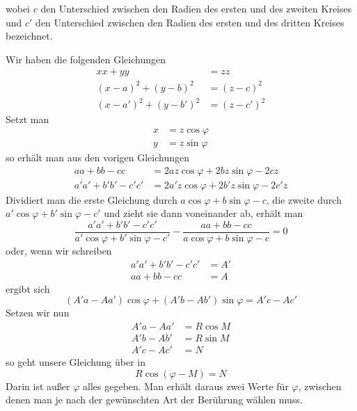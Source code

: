 %
wobei \(c\) den Unterschied zwischen den Radien des ersten und des zweiten Kreises und \(c'\) den Unterschied zwischen den Radien des ersten und des dritten Kreises bezeichnet.

Wir haben die folgenden Gleichungen
\[
\begin{aligned}
xx+yy&=zz\\
(x-a)^2+(y-b)^2&=(z-c)^2\\
(x-a')^2+(y-b')^2&=(z-c')^2
\end{aligned}
\]
Setzt man
\[
\begin{aligned}x&=z\cos\varphi\\y&=z\sin\varphi\end{aligned}
\]
so erhält man aus den vorigen Gleichungen
\[
\begin{aligned}
aa+bb-cc&=2az\cos\varphi+2bz\sin\varphi-2cz\\
a'a'+b'b'-c'c'&=2a'z\cos\varphi+2b'z\sin\varphi-2c'z
\end{aligned}
\]
Dividiert man die erste Gleichung durch \(a\cos\varphi+b\sin\varphi-c\), die zweite durch \(a'\cos\varphi+b'\sin\varphi-c'\) und zieht sie dann voneinander ab, erhält man
\[
\frac{a'a'+b'b'-c'c'}{a'\cos\varphi+b'\sin\varphi-c'}-\frac{aa+bb-cc}{a\cos\varphi+b\sin\varphi-c}=0
\]
oder, wenn wir schreiben
\[
\begin{aligned}a'a'+b'b'-c'c'&=A'\\aa+bb-cc&=A\end{aligned}
\]
ergibt sich
\[
(A'a-Aa')\cos\varphi+(A'b-Ab')\sin\varphi=A'c-Ac'
\]
Setzen wir nun
\[
\begin{aligned}A'a-Aa'&=R\cos M\\A'b-Ab'&=R\sin M\\A'c-Ac'&=N\end{aligned}
\]
so geht unsere Gleichung über in
\[
R\cos(\varphi-M)=N
\]
Darin ist außer \(\varphi\) alles gegeben. Man erhält daraus zwei Werte für \(\varphi\), zwischen denen man je nach der gewünschten Art der Berührung wählen muss.
